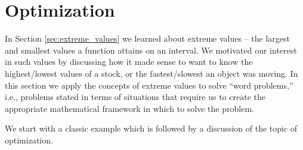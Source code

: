\section{Optimization}\label{sec:optimization}

In Section \ref{sec:extreme_values} we learned about extreme values -- the largest and smallest values a function attains on an interval. We motivated our interest in such values by discussing how it made sense to want to know the highest/lowest values of a stock, or the fastest/slowest an object was moving. In this section we apply the concepts of extreme values to solve ``word problems,'' i.e., problems stated in terms of situations that require us to create the appropriate mathematical framework in which to solve the problem.

\enlargethispage{\baselineskip}
We start with a classic example which is followed by a discussion of the topic of optimization.\\

